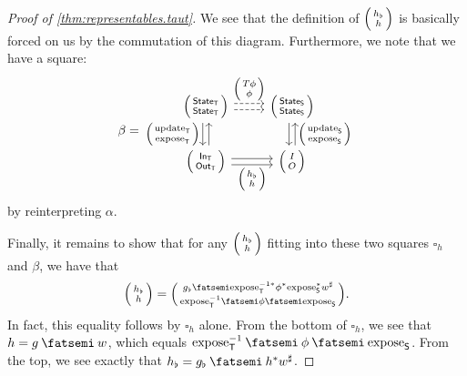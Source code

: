 \documentclass[DynamicalBook]{subfiles}
\begin{document}
\begin{proof}[Proof of \cref{thm:representables.taut}]
 We see that the definition of $\lens{h_{\flat}}{h}$ is basically forced on us
 by the commutation of this diagram. Furthermore, we note that we have a square:
 \[
\beta =    \begin{tikzcd}[ampersand replacement = \&]
      \lens{\State{T}}{\State{T}} \ar[r, shift left, dashed, "\lens{T\phi}{\phi}"] \ar[r, dashed, shift right] \ar[d, shift right,
      "\lens{\update{T}}{\expose{T}}"'] \ar[d, shift left, leftarrow] \&
      \lens{\State{S}}{\State{S}} \ar[d, shift left, leftarrow,
      "\lens{\update{S}}{\expose{S}}"] \ar[d, shift right]\\
      \lens{\In{T}}{\Out{T}} \ar[r, shift right, "\lens{h_{\flat}}{h}"'] \ar[r,
      shift left] \& \lens{I}{O}
    \end{tikzcd} 
\]
by reinterpreting $\alpha$.

Finally, it remains to show that for any $\lens{h_{\flat}}{h}$ fitting into
these two squares $\square_h$ and $\beta$, we have that
\[
\lens{h_{\flat}}{h} = \lens{g_{\flat} \then
  \expose{T}^{-1\ast}\phi^{\ast}\expose{S}^{\ast}w^{\sharp}}{\expose{T}\inv
  \then \phi \then \expose{S}} .
\]
In fact, this equality follows by $\square_h$ alone. From the bottom of $\square_h$, we see that $h = g \then w$, which
equals $\expose{T}\inv \then \phi \then \expose{S}$. From the top, we see
exactly that $h_{\flat} = g_{\flat} \then h^{\ast} w^{\sharp}$.
\end{proof}
\end{document}
